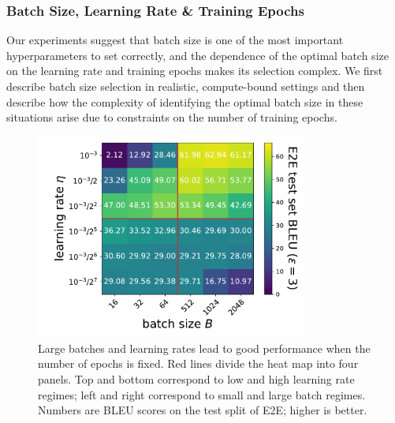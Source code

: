 \subsubsection{Batch Size, Learning Rate \& Training Epochs}
Our experiments suggest that batch size is one of the most important hyperparameters to set correctly, and the dependence of the optimal batch size on the learning rate and training epochs makes its selection complex.
We first describe batch size selection in realistic, compute-bound settings and then describe how the complexity of identifying the optimal batch size in these situations arise due to constraints on the number of training epochs.

\begin{figure}[htbp]
\centering
\includegraphics[width=0.8\textwidth]{figs/bs_vs_lr_BLEU.pdf}
\caption{
Large batches and learning rates lead to good performance when the number of epochs is fixed.
Red lines divide the heat map into four panels. Top and bottom correspond to low and high learning rate regimes; left and right correspond to small and large batch regimes.
Numbers are BLEU scores on the test split of E2E; higher is better.
}
\label{fig:bs_vs_lr}
\end{figure}

